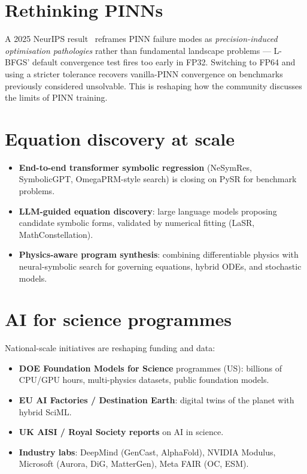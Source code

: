 \section{Rethinking PINNs}
A 2025 NeurIPS result~\cite{rethinking2025pinn} reframes PINN failure
modes as \emph{precision-induced optimisation pathologies} rather than
fundamental landscape problems --- L-BFGS' default convergence test
fires too early in FP32. Switching to FP64 and using a stricter
tolerance recovers vanilla-PINN convergence on benchmarks previously
considered unsolvable. This is reshaping how the community discusses
the limits of PINN training.

\section{Equation discovery at scale}
\begin{itemize}
\item \textbf{End-to-end transformer symbolic regression} (NeSymRes,
SymbolicGPT, OmegaPRM-style search) is closing on PySR for benchmark
problems.
\item \textbf{LLM-guided equation discovery}: large language models
proposing candidate symbolic forms, validated by numerical fitting
(LaSR, MathConstellation).
\item \textbf{Physics-aware program synthesis}: combining differentiable
physics with neural-symbolic search for governing equations, hybrid
ODEs, and stochastic models.
\end{itemize}

\section{AI for science programmes}
National-scale initiatives are reshaping funding and data:
\begin{itemize}
\item \textbf{DOE Foundation Models for Science} programmes (US):
billions of CPU/GPU hours, multi-physics datasets, public foundation
models.
\item \textbf{EU AI Factories / Destination Earth}: digital twins of
the planet with hybrid SciML.
\item \textbf{UK AISI / Royal Society reports} on AI in science.
\item \textbf{Industry labs}: DeepMind (GenCast, AlphaFold), NVIDIA
Modulus, Microsoft (Aurora, DiG, MatterGen), Meta FAIR (OC, ESM).
\end{itemize}

